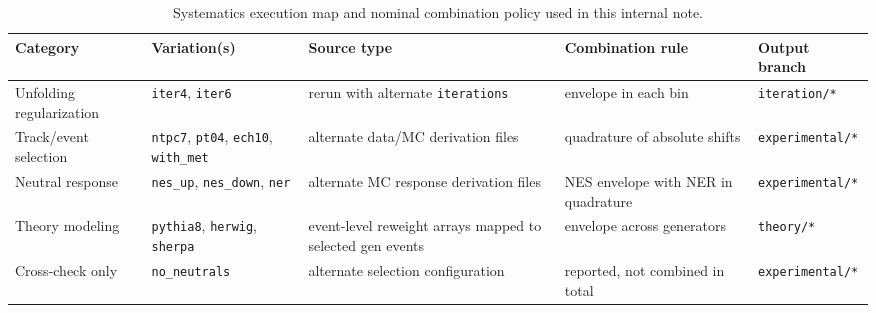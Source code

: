 \begin{table}[t!]
\centering
\scriptsize
\begin{tabular}{p{}p{}p{}p{}p{}}
\hline
Category & Variation(s) & Source type & Combination rule & Output branch \\
\hline
Unfolding regularization & \texttt{iter4}, \texttt{iter6} & rerun with alternate \texttt{iterations} & envelope in each bin & \texttt{iteration/*} \\
Track/event selection & \texttt{ntpc7}, \texttt{pt04}, \texttt{ech10}, \texttt{with\_met} & alternate data/MC derivation files & quadrature of absolute shifts & \texttt{experimental/*} \\
Neutral response & \texttt{nes\_up}, \texttt{nes\_down}, \texttt{ner} & alternate MC response derivation files & NES envelope with NER in quadrature & \texttt{experimental/*} \\
Theory modeling & \texttt{pythia8}, \texttt{herwig}, \texttt{sherpa} & event-level reweight arrays mapped to selected gen events & envelope across generators & \texttt{theory/*} \\
Cross-check only & \texttt{no\_neutrals} & alternate selection configuration & reported, not combined in total & \texttt{experimental/*} \\
\hline
\end{tabular}
\normalsize
\caption{Systematics execution map and nominal combination policy used in this internal note.}
\label{tab:systematics_execution_map}
\end{table}
